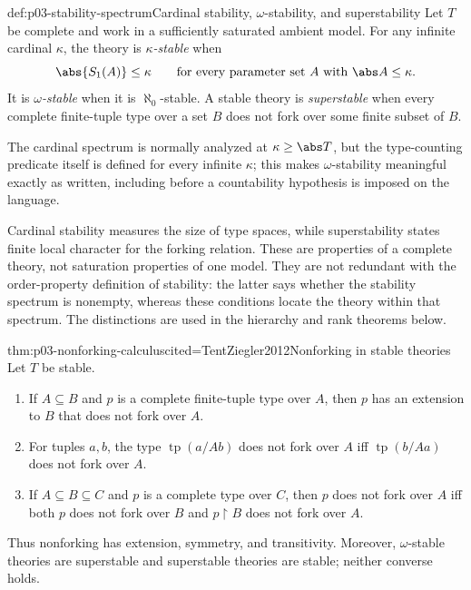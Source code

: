\begin{hbdefinition}{def:p03-stability-spectrum}{Cardinal stability, \(\omega\)-stability, and superstability}
Let \(T\) be complete and work in a sufficiently saturated ambient model.
For any infinite cardinal \(\kappa\), the theory is
\emph{\(\kappa\)-stable} when
\[
  \abs{S_1(A)}\leq\kappa
  \qquad\text{for every parameter set }A\text{ with }\abs A\leq\kappa.
\]
It is \emph{\(\omega\)-stable} when it is \(\aleph_0\)-stable.  A stable
theory is \emph{superstable} when every complete finite-tuple type over a set
\(B\) does not fork over some finite subset of \(B\).

The cardinal spectrum is normally analyzed at \(\kappa\geq\abs T\), but the
type-counting predicate itself is defined for every infinite \(\kappa\); this
makes \(\omega\)-stability meaningful exactly as written, including before a
countability hypothesis is imposed on the language.

Cardinal stability measures the size of type spaces, while superstability
states finite local character for the forking relation.  These are properties
of a complete theory, not saturation properties of one model.  They are not
redundant with the order-property definition of stability: the latter says
whether the stability spectrum is nonempty, whereas these conditions locate
the theory within that spectrum.  The distinctions are used in the hierarchy
and rank theorems below.
\end{hbdefinition}

\begin{hbtheorem}{thm:p03-nonforking-calculus}{cited=TentZiegler2012}{Nonforking in stable theories}
Let \(T\) be stable.
\begin{enumerate}
  \item If \(A\subseteq B\) and \(p\) is a complete finite-tuple type over
        \(A\), then \(p\) has an extension to \(B\) that does not fork over
        \(A\).
  \item For tuples \(a,b\), the type \(\operatorname{tp}(a/Ab)\) does not
        fork over \(A\) iff \(\operatorname{tp}(b/Aa)\) does not fork over
        \(A\).
  \item If \(A\subseteq B\subseteq C\) and \(p\) is a complete type over
        \(C\), then \(p\) does not fork over \(A\) iff both \(p\) does not
        fork over \(B\) and \(p\mathbin{\upharpoonright}B\) does not fork
        over \(A\).
\end{enumerate}
Thus nonforking has extension, symmetry, and transitivity.  Moreover,
\(\omega\)-stable theories are superstable and superstable theories are
stable; neither converse holds.
\end{hbtheorem}

